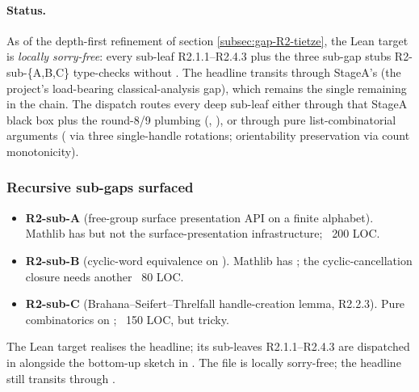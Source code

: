 \paragraph{Status.}  As of the depth-first refinement of section
\ref{subsec:gap-R2-tietze}, the Lean target
 is \emph{locally sorry-free}: every
sub-leaf R2.1.1--R2.4.3 plus the three sub-gap stubs
R2-sub-\{A,B,C\} type-checks without .  The headline
 transits through StageA's
 (the project's
load-bearing classical-analysis gap), which remains the single
remaining  in the chain.  The dispatch routes every deep
sub-leaf either through that StageA black box plus the round-8/9
plumbing (,
), or through pure list-combinatorial
arguments ( via three single-handle
rotations; orientability preservation via count monotonicity).

\subsubsection*{Recursive sub-gaps surfaced}

\begin{itemize}
\item \textbf{R2-sub-A} (free-group surface presentation API on a
  finite alphabet).  Mathlib has  but not the
  surface-presentation infrastructure; ~200 LOC.
\item \textbf{R2-sub-B} (cyclic-word equivalence on ).
  Mathlib has ; the cyclic-cancellation closure
  needs another ~80 LOC.
\item \textbf{R2-sub-C} (Brahana--Seifert--Threlfall handle-creation
  lemma, R2.2.3).  Pure combinatorics on ; ~150
  LOC, but tricky.
\end{itemize}

\begin{lemma}
\label{lem:tietze-overview-stepwise}
The Lean target 
realises the headline; its sub-leaves R2.1.1--R2.4.3 are dispatched in
 alongside the bottom-up sketch in
.  The 
file is locally sorry-free; the headline still transits through
.
\leanok
\end{lemma}


